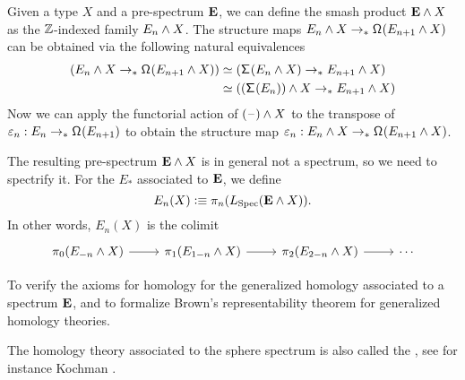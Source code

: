 \documentclass[reqno]{amsart}
\begin{document}
Given a type $X$ and a pre-spectrum $\mathbf{E}$, we can define the smash product $\mathbf{E} \wedge X$ as the
$\mathbb{Z}$-indexed family $E_n \wedge X$. The structure maps $E_n \wedge X\to_\ast\mathsf{\Omega}^{}(E_{n+1} \wedge X)$ can be obtained via the following natural equivalences
\begin{align*}
(E_n \wedge X\to_\ast\mathsf{\Omega}^{}(E_{n+1} \wedge X))
& \simeq (\mathsf{\Sigma}^{}(E_n \wedge X) \to_\ast E_{n+1} \wedge X) \\
& \simeq ((\mathsf{\Sigma}^{}(E_n)) \wedge X \to_\ast E_{n+1} \wedge X)
\end{align*}
Now we can apply the functorial action of $(\mathord{\hspace{1pt}\text{--}\hspace{1pt}}) \wedge X$ to the transpose of $\varepsilon_n:E_n\to_\ast\mathsf{\Omega}^{}(E_{n+1})$ to obtain the structure map $\varepsilon_n:E_n \wedge X\to_\ast\mathsf{\Omega}^{}(E_{n+1} \wedge X)$. 

The resulting pre-spectrum $\mathbf{E} \wedge X$ is in general not a spectrum, so we need to spectrify it. For the  $E_\ast$ associated to $\mathbf{E}$, we define 
\begin{equation*}
E_n(X) \vcentcolon\equiv \pi_n(L_{\mathrm{Spec}}(\mathbf{E} \wedge X)).
\end{equation*}
In other words, $E_n(X)$ is the colimit
\begin{equation*}
\begin{tikzcd}
\pi_0(E_{-n}\wedge X) \arrow[r] & \pi_{1}(E_{1-n}\wedge X) \arrow[r] & \pi_{2}(E_{2-n}\wedge X) \arrow[r] & \cdots
\end{tikzcd}
\end{equation*}

\begin{proposal}\label{p:generalized_homology}
To verify the axioms for homology for the generalized homology associated to a spectrum $\mathbf{E}$, and to formalize Brown's representability theorem for generalized homology theories.
\end{proposal}

The homology theory associated to the sphere spectrum is also called the , see for instance Kochman \cite{Kochman96}.
\end{document}
